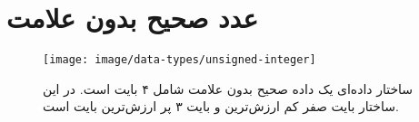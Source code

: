 \section{عدد صحیح بدون علامت}

% 
% 


\begin{figure}
\centering
\texttt{[image: image/data-types/unsigned-integer]}
\caption[ساختار یک داده صحیح بدون علامت]{
	ساختار داده‌ای یک داده صحیح بدون علامت شامل ۴ بایت است. در این ساختار بایت صفر
	کم ارزش‌ترین و بایت ۳ پر ارزش‌ترین بایت است.
}
\label{image/data-types/unsigned-integer}
\end{figure}






